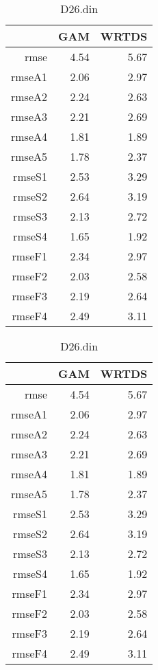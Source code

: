 \documentclass[12pt]{amsart}
\begin{document}
\begin{table}[H]
\centering
\begin{tabular}{rrr}
  \hline
 & GAM & WRTDS \\ 
  \hline
rmse & 4.54 & 5.67 \\ 
  rmseA1 & 2.06 & 2.97 \\ 
  rmseA2 & 2.24 & 2.63 \\ 
  rmseA3 & 2.21 & 2.69 \\ 
  rmseA4 & 1.81 & 1.89 \\ 
  rmseA5 & 1.78 & 2.37 \\ 
  rmseS1 & 2.53 & 3.29 \\ 
  rmseS2 & 2.64 & 3.19 \\ 
  rmseS3 & 2.13 & 2.72 \\ 
  rmseS4 & 1.65 & 1.92 \\ 
  rmseF1 & 2.34 & 2.97 \\ 
  rmseF2 & 2.03 & 2.58 \\ 
  rmseF3 & 2.19 & 2.64 \\ 
  rmseF4 & 2.49 & 3.11 \\ 
   \hline
\end{tabular}
\caption{D26.din}
\end{table}

\begin{table}[H]
\centering
\begin{tabular}{rrr}
  \hline
 & GAM & WRTDS \\ 
  \hline
rmse & 4.54 & 5.67 \\ 
  rmseA1 & 2.06 & 2.97 \\ 
  rmseA2 & 2.24 & 2.63 \\ 
  rmseA3 & 2.21 & 2.69 \\ 
  rmseA4 & 1.81 & 1.89 \\ 
  rmseA5 & 1.78 & 2.37 \\ 
  rmseS1 & 2.53 & 3.29 \\ 
  rmseS2 & 2.64 & 3.19 \\ 
  rmseS3 & 2.13 & 2.72 \\ 
  rmseS4 & 1.65 & 1.92 \\ 
  rmseF1 & 2.34 & 2.97 \\ 
  rmseF2 & 2.03 & 2.58 \\ 
  rmseF3 & 2.19 & 2.64 \\ 
  rmseF4 & 2.49 & 3.11 \\ 
   \hline
\end{tabular}
\caption{D26.din}
\end{table}
\end{document}
